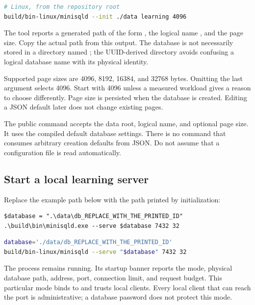 \begin{lstlisting}[language=bash]
# Linux, from the repository root
build/bin-linux/minisqld --init ./data learning 4096
\end{lstlisting}

The tool reports a generated path of the form
, the logical name ,
and the page size. Copy the actual path from this output. The database is not
necessarily stored in a directory named ; the UUID-derived
directory avoids confusing a logical database name with its physical identity.

Supported page sizes are 4096, 8192, 16384, and 32768 bytes. Omitting the last
argument selects 4096. Start with 4096 unless a measured workload gives a
reason to choose differently. Page size is persisted when the database is
created. Editing a JSON default later does not change existing pages.

The public  command accepts the data root, logical name, and
optional page size. It uses the compiled default database settings. There is
no  command that consumes arbitrary creation defaults
from JSON. Do not assume that a configuration file is read automatically.


\subsection{Start a local learning server}

Replace the example path below with the path printed by initialization:

\begin{lstlisting}
$database = ".\data\db_REPLACE_WITH_THE_PRINTED_ID"
.\build\bin\minisqld.exe --serve $database 7432 32
\end{lstlisting}

\begin{lstlisting}[language=bash]
database='./data/db_REPLACE_WITH_THE_PRINTED_ID'
build/bin-linux/minisqld --serve "$database" 7432 32
\end{lstlisting}

The process remains running. Its startup banner reports the mode, physical
database path, address, port, connection limit, and request budget. This
particular mode binds to  and trusts local clients. Every
local client that can reach the port is administrative; a database password
does not protect this mode.

